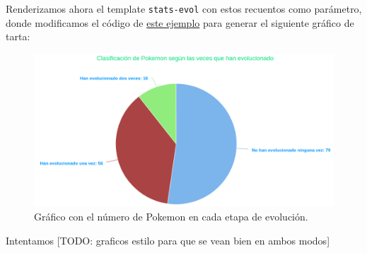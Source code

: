 \documentclass{article}
\begin{document}
Renderizamos ahora el template \texttt{stats-evol} con estos recuentos
como parámetro, donde modificamos el código de \href{}{este ejemplo}
para generar el siguiente gráfico de tarta:

\begin{figure}[H]
  \centering
  \includegraphics[width=190mm]{imgs/stats-evol}
  \caption{Gráfico con el número de Pokemon en cada etapa de evolución.}
  \label{fig:stats-evol}
\end{figure}

Intentamos [TODO: graficos estilo para que se vean bien en ambos modos]
  
\end{document}
